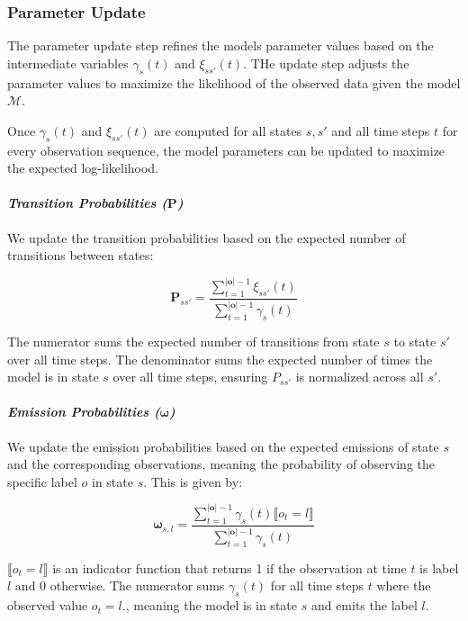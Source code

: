 \subsubsection{Parameter Update}
The parameter update step refines the models parameter values based on the intermediate variables $\gamma_s(t)$ and $\xi_{ss'}(t)$.
THe update step adjusts the parameter values to maximize the likelihood of the observed data given the model $\mathcal{M}$.

Once $\gamma_s(t)$ and $\xi_{ss'}(t)$ are computed for all states $s, s'$ and all time steps $t$ for every observation sequence, the model parameters can be updated to maximize the expected log-likelihood.

\paragraph*{\textit{Transition Probabilities ($\pmb{P}$)}}

We update the transition probabilities based on the expected number of transitions between states:


\begin{equation}
    \pmb{P}_{s s'} = \frac{\sum_{t = 1}^{|\mathbf{o}|-1} \xi_{ss'}(t)}{\sum_{t = 1}^{|\mathbf{o}|-1} \gamma_s(t)}
    \label{eq:transition-probabilities}
\end{equation}


The numerator sums the expected number of transitions from state $s$ to state $s'$ over all time steps.
The denominator sums the expected number of times the model is in state $s$ over all time steps, ensuring $P_{ss'}$ is normalized across all $s'$.

\paragraph*{\textit{Emission Probabilities ($\pmb{\omega}$)}}

We update the emission probabilities based on the expected emissions of state $s$ and the corresponding observations, meaning the probability of observing the specific label $o$ in state $s$.
This is given by:

\begin{equation}
    \pmb{\omega}_{s, l} = \frac{\sum_{t = 1}^{|\mathbf{o}|-1} \gamma_s(t) \lBrack o_t = l \rBrack}{\sum_{t = 1}^{|\mathbf{o}|-1} \gamma_s(t)}
    \label{eq:omega}
\end{equation}

$\lBrack o_t = l \rBrack$ is an indicator function that returns 1 if the observation at time $t$ is label $l$ and 0 otherwise.
The numerator sums $\gamma_s(t)$ for all time steps $t$ where the observed value $o_t = l$., meaning the model is in state $s$ and emits the label $l$.

